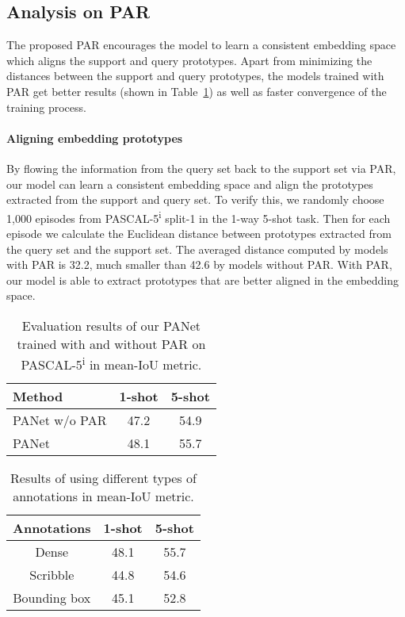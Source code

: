 \documentclass[10pt,twocolumn,letterpaper]{article}
\begin{document}
\vspace{-2mm}
\subsection{Analysis on PAR} \label{experiment-par}


The proposed PAR encourages the model to learn a consistent embedding space which aligns the support and query prototypes. Apart from minimizing the distances between the support and query prototypes, the models trained with PAR get better results (shown in Table~\ref{table:ablation}) as well as faster convergence of the training process.

\vspace{-12pt}
\paragraph{Aligning embedding prototypes} By flowing the information from the query set back to the support set via PAR, our model can learn a consistent embedding space and align the prototypes extracted from the support and query set. To verify this, we randomly choose 1,000 episodes from PASCAL-5\textsuperscript{i} split-1 in the 1-way 5-shot task. Then for each episode we calculate the Euclidean distance between prototypes extracted from the query set and the support set. The averaged distance computed by models with PAR is 32.2, much smaller than 42.6 by models without PAR. With PAR, our model is able to extract prototypes that are better aligned in the embedding space.

\begin{table}[t]
\centering
 \begin{tabular}{l|cc} 
\toprule
 Method & 1-shot & 5-shot
 \\
 \midrule
 PANet w/o  PAR & 47.2 & 54.9
 \\
 PANet & 48.1 & 55.7
 \\
\bottomrule
 \end{tabular}
 \caption{Evaluation results of our PANet trained with and without PAR on PASCAL-5\textsuperscript{i} in mean-IoU metric.}
\label{table:ablation}
\end{table}

\begin{table}[t!]
\centering
 \begin{tabular}{c |c c}
 \toprule
 Annotations & 1-shot & 5-shot
 \\
 \midrule
 Dense & 48.1 & 55.7
 \\
 Scribble & 44.8 & 54.6
 \\
 Bounding box & 45.1 & 52.8
 \\
 \bottomrule
 \end{tabular}
 \caption{Results of using different types of annotations in mean-IoU metric.}
\label{table:pascal_result_sparse}
\end{table}
\end{document}
